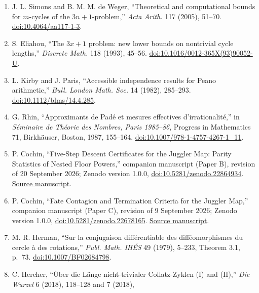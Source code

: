 \documentclass[12pt]{article}
\begin{document}
\begin{enumerate}
  (1984), 167--175.
  \href{https://doi.org/10.4064/aa-43-2-167-175}{doi:10.4064/aa-43-2-167-175}.
\item
  J. L. Simons and B. M. M. de Weger, ``Theoretical and computational
  bounds for \(m\)-cycles of the \(3n+1\)-problem,'' \emph{Acta Arith.}
  117 (2005), 51--70.
  \href{https://doi.org/10.4064/aa117-1-3}{doi:10.4064/aa117-1-3}.
\item
  S. Eliahou, ``The \(3x+1\) problem: new lower bounds on nontrivial
  cycle lengths,'' \emph{Discrete Math.} 118 (1993), 45--56.
  \href{https://doi.org/10.1016/0012-365X(93)90052-U}{doi:10.1016/0012-365X(93)90052-U}.
\item
  L. Kirby and J. Paris, ``Accessible independence results for Peano
  arithmetic,'' \emph{Bull. London Math. Soc.} 14 (1982), 285--293.
  \href{https://doi.org/10.1112/blms/14.4.285}{doi:10.1112/blms/14.4.285}.
\item
  G. Rhin, ``Approximants de Pad\'{e} et mesures effectives
  d'irrationalit\'{e},'' in \emph{S\'{e}minaire de Th\'{e}orie des
  Nombres, Paris 1985--86}, Progress in Mathematics 71, Birkh\"{a}user,
  Boston, 1987, 155--164.
  \href{https://doi.org/10.1007/978-1-4757-4267-1_11}{doi:10.1007/978-1-4757-4267-1\_11}.
\item
  P. Cochin, ``Five-Step Descent Certificates for the Juggler Map:
  Parity Statistics of Nested Floor Powers,'' companion manuscript
  (Paper B), revision of 20 September 2026; Zenodo version 1.0.0,
  \href{https://doi.org/10.5281/zenodo.22864934}{doi:10.5281/zenodo.22864934}.
  \href{https://github.com/sneakyweasel/btlab/blob/main/docs/theory/juggler_parity_discrepancy_note.md}{Source
  manuscript}.
\item
  P. Cochin, ``Fate Contagion and Termination Criteria for the Juggler
  Map,'' companion manuscript (Paper C), revision of 9 September 2026;
  Zenodo version 1.0.0,
  \href{https://doi.org/10.5281/zenodo.22678165}{doi:10.5281/zenodo.22678165}.
  \href{https://github.com/sneakyweasel/btlab/blob/main/docs/theory/juggler_fate_almost_all_note.md}{Source
  manuscript}.
\item
  M. R. Herman, ``Sur la conjugaison diff\'{e}rentiable des
  diff\'{e}omorphismes du cercle \`{a} des rotations,'' \emph{Publ.
  Math. IH\'{E}S} 49 (1979), 5--233, Theorem 3.1, p.~73.
  \href{https://doi.org/10.1007/BF02684798}{doi:10.1007/BF02684798}.
\item
  C. Hercher, ``\"{U}ber die L\"{a}nge nicht-trivialer Collatz-Zyklen
  (I) and (II),'' \emph{Die Wurzel} 6 (2018), 118--128 and 7 (2018),

\end{enumerate}
\end{document}
